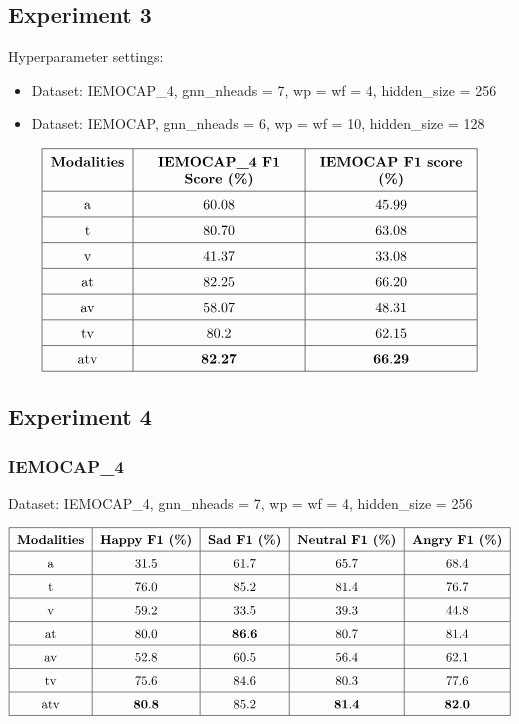 \documentclass[a4paper]{article}
\begin{document}
\subsection{Experiment 3}
Hyperparameter settings: 

\begin{itemize}
    \item Dataset: IEMOCAP\_4, gnn\_nheads = 7, wp = wf = 4, hidden\_size = 256
    \item Dataset: IEMOCAP, gnn\_nheads = 6, wp = wf = 10, hidden\_size = 128
\end{itemize}

\[
\renewcommand{\arraystretch}{1.5}
\begin{tabular}{|c|p{3.9cm}<{\centering}|p{3.9cm}<{\centering}|}
    \hline
    \textbf{Modalities} & \textbf{IEMOCAP\_4 F1 Score (\%)} & \textbf{IEMOCAP F1 score (\%)} \\
    \hline
    \text{a} & 60.08 & 45.99 \\
    \hline
    \text{t} & 80.70 & 63.08 \\
    \hline
    \text{v} & 41.37 & 33.08 \\
    \hline
    \text{at} & 82.25 & 66.20 \\
    \hline
    \text{av} & 58.07 & 48.31 \\
    \hline
    \text{tv} & 80.2 & 62.15 \\
    \hline
    \text{atv} & \(\mathbf{82.27}\) & \(\mathbf{66.29}\) \\
    \hline
\end{tabular}
\]

\newpage
\subsection{Experiment 4}

\subsubsection{IEMOCAP\_4}
Dataset: IEMOCAP\_4, gnn\_nheads = 7, wp = wf = 4, hidden\_size = 256

\[
\renewcommand{\arraystretch}{1.5}
\begin{tabular}{|c|c|c|c|c|}
    \hline
    \textbf{Modalities} & \textbf{Happy F1 (\%)} & \textbf{Sad F1 (\%)} & \textbf{Neutral F1 (\%)} & \textbf{Angry F1 (\%)} \\
    \hline
    \text{a} & 31.5 & 61.7 & 65.7 & 68.4 \\
    \hline
    \text{t} & 76.0 & 85.2 & 81.4 & 76.7 \\
    \hline
    \text{v} & 59.2 & 33.5 & 39.3 & 44.8 \\
    \hline
    \text{at} & 80.0 & \(\mathbf{86.6}\) & 80.7 & 81.4 \\
    \hline
    \text{av} & 52.8 & 60.5 & 56.4 & 62.1 \\
    \hline
    \text{tv} & 75.6 & 84.6 & 80.3 & 77.6 \\
    \hline
    \text{atv} & \(\mathbf{80.8}\) & 85.2 & \(\mathbf{81.4}\) & \(\mathbf{82.0}\) \\
    \hline 
\end{tabular}
\]
\end{document}
